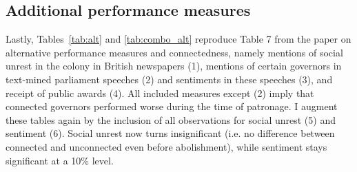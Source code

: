 \documentclass[a4paper]{article}\usepackage[]{graphicx}\usepackage[]{xcolor}
\begin{document}
\subsection{Additional performance measures}
\hspace*{5mm} Lastly, Tables~\ref{tab:alt} and \ref{tab:combo_alt} reproduce Table 7 from the paper on alternative performance measures and connectedness, namely mentions of social unrest in the colony in British newspapers (1), mentions of certain governors in text-mined parliament speeches (2) and sentiments in these speeches (3), and receipt of public awards (4). All included measures except (2) imply that connected governors performed worse during the time of patronage. I augment these tables again by the inclusion of all observations for social unrest (5) and sentiment (6). Social unrest now turns insignificant (i.e. no difference between connected and unconnected even before abolishment), while sentiment stays significant at a 10\% level.
\end{document}
